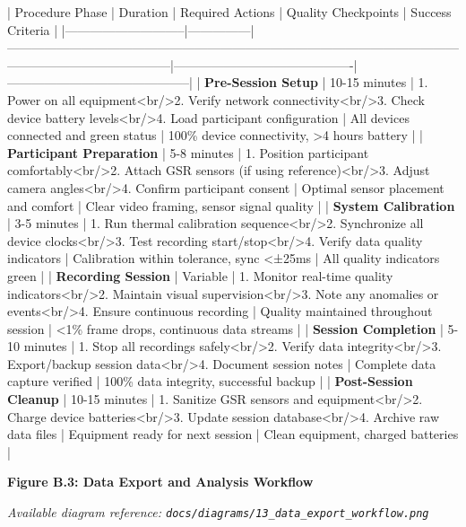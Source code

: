 \documentclass[12pt,a4paper]{article}
\begin{document}
| Procedure Phase             | Duration      | Required Actions                                                                                                                                  | Quality Checkpoints                       | Success Criteria                           |
|-----------------------------|---------------|---------------------------------------------------------------------------------------------------------------------------------------------------|-------------------------------------------|--------------------------------------------|
| \textbf{Pre-Session Setup}       | 10-15 minutes | 1. Power on all equipment<br/>2. Verify network connectivity<br/>3. Check device battery levels<br/>4. Load participant configuration             | All devices connected and green status    | 100\% device connectivity, >4 hours battery |
| \textbf{Participant Preparation} | 5-8 minutes   | 1. Position participant comfortably<br/>2. Attach GSR sensors (if using reference)<br/>3. Adjust camera angles<br/>4. Confirm participant consent | Optimal sensor placement and comfort      | Clear video framing, sensor signal quality |
| \textbf{System Calibration}      | 3-5 minutes   | 1. Run thermal calibration sequence<br/>2. Synchronize all device clocks<br/>3. Test recording start/stop<br/>4. Verify data quality indicators   | Calibration within tolerance, sync <±25ms | All quality indicators green               |
| \textbf{Recording Session}       | Variable      | 1. Monitor real-time quality indicators<br/>2. Maintain visual supervision<br/>3. Note any anomalies or events<br/>4. Ensure continuous recording | Quality maintained throughout session     | <1\% frame drops, continuous data streams   |
| \textbf{Session Completion}      | 5-10 minutes  | 1. Stop all recordings safely<br/>2. Verify data integrity<br/>3. Export/backup session data<br/>4. Document session notes                        | Complete data capture verified            | 100\% data integrity, successful backup     |
| \textbf{Post-Session Cleanup}    | 10-15 minutes | 1. Sanitize GSR sensors and equipment<br/>2. Charge device batteries<br/>3. Update session database<br/>4. Archive raw data files                 | Equipment ready for next session          | Clean equipment, charged batteries         |

\textbf{Figure B.3: Data Export and Analysis Workflow}

\textit{Available diagram reference: \texttt{docs/diagrams/13\_data\_export\_workflow.png}}
\end{document}
